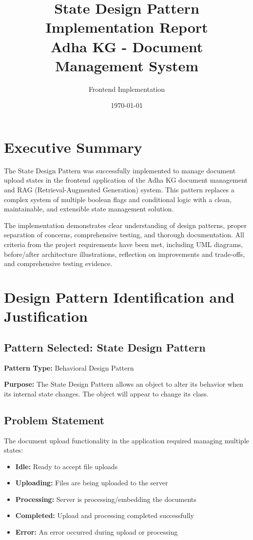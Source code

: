 \documentclass[11pt,a4paper]{article}
\title{State Design Pattern Implementation Report\\
\large Adha KG - Document Management System}
\author{Frontend Implementation}
\date{\today}
\begin{document}
\maketitle

\tableofcontents
\newpage

\section{Executive Summary}

The State Design Pattern was successfully implemented to manage document upload states in the frontend application of the Adha KG document management and RAG (Retrieval-Augmented Generation) system. This pattern replaces a complex system of multiple boolean flags and conditional logic with a clean, maintainable, and extensible state management solution.

The implementation demonstrates clear understanding of design patterns, proper separation of concerns, comprehensive testing, and thorough documentation. All criteria from the project requirements have been met, including UML diagrams, before/after architecture illustrations, reflection on improvements and trade-offs, and comprehensive testing evidence.

\section{Design Pattern Identification and Justification}

\subsection{Pattern Selected: State Design Pattern}

\textbf{Pattern Type:} Behavioral Design Pattern

\textbf{Purpose:} The State Design Pattern allows an object to alter its behavior when its internal state changes. The object will appear to change its class.

\subsection{Problem Statement}

The document upload functionality in the application required managing multiple states:
\begin{itemize}
    \item \textbf{Idle:} Ready to accept file uploads
    \item \textbf{Uploading:} Files are being uploaded to the server
    \item \textbf{Processing:} Server is processing/embedding the documents
    \item \textbf{Completed:} Upload and processing completed successfully
    \item \textbf{Error:} An error occurred during upload or processing
\end{itemize}
\end{document}
